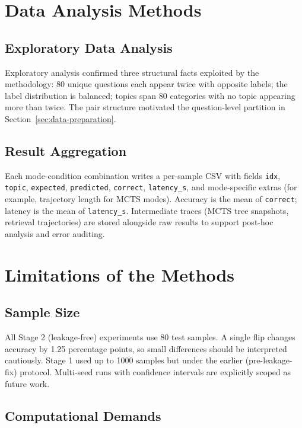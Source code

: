 \documentclass[12pt,a4paper]{report}
\begin{document}
\section{Data Analysis Methods}
\label{sec:analysis}

\subsection{Exploratory Data Analysis}

Exploratory analysis confirmed three structural facts exploited by the methodology: 80 unique questions each appear twice with opposite labels; the label distribution is balanced; topics span 80 categories with no topic appearing more than twice. The pair structure motivated the question-level partition in Section~\ref{sec:data-preparation}.

\subsection{Result Aggregation}

Each mode-condition combination writes a per-sample CSV with fields \texttt{idx}, \texttt{topic}, \texttt{expected}, \texttt{predicted}, \texttt{correct}, \texttt{latency\_s}, and mode-specific extras (for example, trajectory length for MCTS modes). Accuracy is the mean of \texttt{correct}; latency is the mean of \texttt{latency\_s}. Intermediate traces (MCTS tree snapshots, retrieval trajectories) are stored alongside raw results to support post-hoc analysis and error auditing.

\section{Limitations of the Methods}
\label{sec:limitations}

\subsection{Sample Size}

All Stage 2 (leakage-free) experiments use 80 test samples. A single flip changes accuracy by 1.25 percentage points, so small differences should be interpreted cautiously. Stage 1 used up to 1000 samples but under the earlier (pre-leakage-fix) protocol. Multi-seed runs with confidence intervals are explicitly scoped as future work.

\subsection{Computational Demands}
\end{document}
